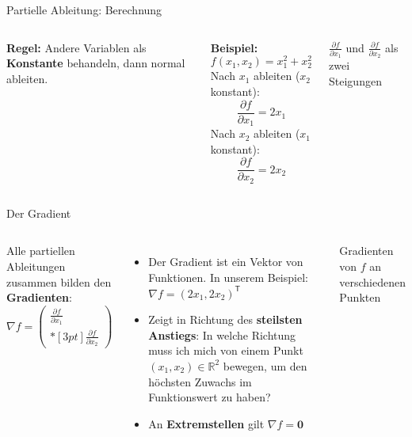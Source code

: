 {\begin{frame}{Partielle Ableitung: Berechnung}
    \small
\begin{columns}
\textbf{Regel:} Andere Variablen als \textbf{Konstante} behandeln, dann normal ableiten.

\medskip

\textbf{Beispiel:}
\[f(x_1,x_2)=x_1^2+x_2^2\]
Nach $x_1$ ableiten ($x_2$ konstant):
\[\frac{\partial f}{\partial x_1}=2x_1\]
Nach $x_2$ ableiten ($x_1$ konstant):
\[\frac{\partial f}{\partial x_2}=2x_2\]

\centering
{}

\smallskip
{\footnotesize \textcolor{PrimaryColor}{$\frac{\partial f}{\partial x_1}$} und \textcolor{SliceY}{$\frac{\partial f}{\partial x_2}$} als zwei Steigungen}
\end{columns}
\end{frame}

\begin{frame}{Der Gradient}
\small
\begin{columns}
Alle partiellen Ableitungen zusammen bilden den \textbf{Gradienten}:
\[
\nabla f = \begin{pmatrix}
\frac{\partial f}{\partial x_1} \\*[3pt]
\frac{\partial f}{\partial x_2}
\end{pmatrix}
\]

\medskip

\begin{itemize}
\item Der Gradient ist ein Vektor von Funktionen. In unserem Beispiel:
$\nabla f = (2x_1, 2x_2)^{\mathsf{T}}$
\item Zeigt in Richtung des \textbf{steilsten Anstiegs}: In welche Richtung muss ich mich von einem Punkt $(x_1,x_2)\in \mathbb{R}^2$ bewegen, um den höchsten Zuwachs im Funktionswert zu haben?
\item An \textbf{Extremstellen} gilt $\nabla f=\mathbf{0}$
\end{itemize}

\centering

\footnotesize Gradienten von $f$ an verschiedenen Punkten

\end{columns}
\end{frame}
}

